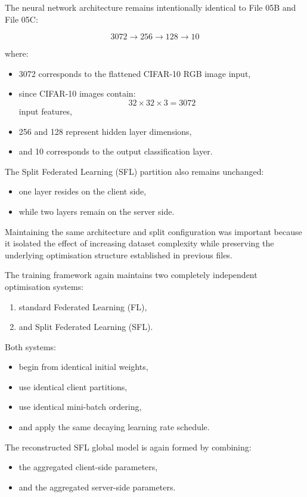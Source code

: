 The neural network architecture remains intentionally identical to File 05B and File 05C:

\[
3072 \rightarrow 256 \rightarrow 128 \rightarrow 10
\]

where:
\begin{itemize}
    \item 3072 corresponds to the flattened CIFAR-10 RGB image input,
    \item since CIFAR-10 images contain:
    \[
    32 \times 32 \times 3 = 3072
    \]
    input features,
    \item 256 and 128 represent hidden layer dimensions,
    \item and 10 corresponds to the output classification layer.
\end{itemize}

The Split Federated Learning (SFL) partition also remains unchanged:
\begin{itemize}
    \item one layer resides on the client side,
    \item while two layers remain on the server side.
\end{itemize}

Maintaining the same architecture and split configuration was important because it isolated the effect of increasing dataset complexity while preserving the underlying optimisation structure established in previous files.

The training framework again maintains two completely independent optimisation systems:
\begin{enumerate}
    \item standard Federated Learning (FL),
    \item and Split Federated Learning (SFL).
\end{enumerate}

Both systems:
\begin{itemize}
    \item begin from identical initial weights,
    \item use identical client partitions,
    \item use identical mini-batch ordering,
    \item and apply the same decaying learning rate schedule.
\end{itemize}

The reconstructed SFL global model is again formed by combining:
\begin{itemize}
    \item the aggregated client-side parameters,
    \item and the aggregated server-side parameters.
\end{itemize}

